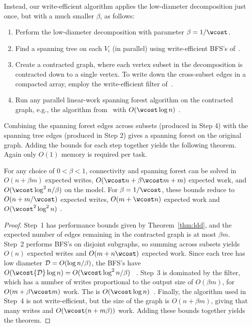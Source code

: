 Instead, our write-efficient algorithm applies the low-diameter
decomposition just once, but with a much smaller $\beta$, as follows:
\begin{enumerate}
\item Perform the low-diameter decomposition with parameter
  $\beta = 1/\wcost$.
\item Find a spanning tree on each $V_i$ (in parallel) using
  write-efficient BFS's of~\cite{BBFGGMS16}.
\item Create a contracted graph, where each vertex subset in the
  decomposition is contracted down to a single vertex.  To write down
  the cross-subset edges in a compacted array, employ the
  write-efficient filter of~\cite{BBFGGMS16}.
\item Run any parallel linear-work spanning forest algorithm on the
  contracted graph, e.g., the algorithm from~\cite{ColeKT96} with
  $O(\wcost \log n)$ \depth{}.
\end{enumerate}
Combining the spanning forest edges across subsets (produced in Step
4) with the spanning tree edges (produced in Step 2) gives a spanning
forest on the original graph.  Adding the bounds for each step
together yields the following theorem.  Again only $O(1)$ \local{}
memory is required per task.

\begin{theorem}\label{thm:cc-linear}
  For any choice of $0 < \beta < 1$, connectivity and spanning forest
  can be solved in $O(n+\beta m)$ expected writes,
  $O(\wcost n + \beta \wcost m + m)$ expected work, and
  $O(\wcost \log^2 n / \beta)$ \depth{} \whp{} on the \ourmodel{}
  model.  For $\beta = 1/\wcost$, these bounds reduce to
  $O(n + m/\wcost)$ expected writes, $O(m+\wcost n)$ expected work and
  $O(\wcost^2\log^2n)$ \depth{} \whp{}.
\end{theorem}
\begin{proof}
  Step~1 has performance bounds given by Theorem~\ref{thm:ldd}, and
  the expected number of edges remaining in the contracted graph is at
  most $\beta m$.  Step~2 performs BFS's on disjoint subgraphs, so
  summing across subsets yields $O(n)$ expected writes and
  $O(m+n\wcost)$ expected work.  Since each tree has low diameter
  ${\cal D} = O(\log n / \beta)$, the BFS's have \depth{} $O(\wcost
  {\cal D} \log n) = O(\wcost \log^2 n / \beta)$
  \whp{}~\cite{BBFGGMS16}.  Step~3 is dominated by the filter, which
  has a number of writes proportional to the output size of $O(\beta
  m)$, for $O(m + \beta \wcost m)$ work. The \depth{} is $O(\wcost
  \log n)$~\cite{BBFGGMS16}.  Finally, the algorithm used in Step~4 is
  not write-efficient, but the size of the graph is $O(n+\beta m)$,
  giving that many writes and $O(\wcost (n + m\beta))$ work.  Adding
  these bounds together yields the theorem.
\end{proof}

